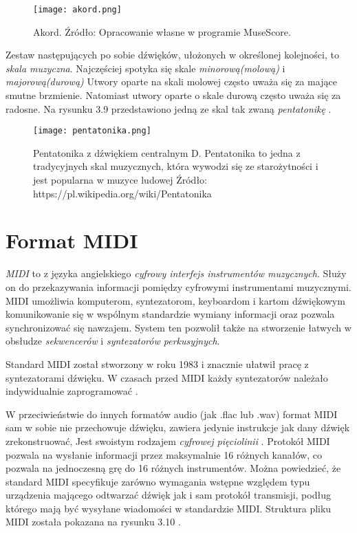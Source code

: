  \begin{figure}[H]
\texttt{[image: akord.png]}
\centering
\caption{Akord. Źródło: Opracowanie własne w programie MuseScore.}
\centering
\end{figure}

Zestaw następujących po sobie dźwięków, ułożonych w określonej kolejności, to \textit{skala muzyczna}. Najczęściej spotyka się skale \textit{minorową(molową)} i \textit{majorową(durową)} Utwory oparte na skali molowej często uważa się za mające smutne brzmienie. Natomiast utwory oparte o skale durową często uważa się za radosne. Na rysunku 3.9 przedstawiono jedną ze skal tak zwaną \textit{pentatonikę} \citep[s. 81 - 82]{Pilhofer2018}. 

 \begin{figure}[H]
\texttt{[image: pentatonika.png]}
\caption{Pentatonika z dźwiękiem centralnym D. Pentatonika to jedna z tradycyjnych skal muzycznych, która wywodzi się ze starożytności i jest popularna w muzyce ludowej  Źródło: https://pl.wikipedia.org/wiki/Pentatonika}
\centering
\end{figure}

\section{Format MIDI}
\textit{MIDI} to z języka angielskiego \textit{cyfrowy interfejs instrumentów muzycznych}. Służy on do przekazywania informacji pomiędzy cyfrowymi instrumentami muzycznymi. MIDI umożliwia komputerom, syntezatorom, keyboardom i kartom dźwiękowym komunikowanie się w wspólnym standardzie wymiany informacji oraz pozwala synchronizować się nawzajem. System ten pozwolił także na stworzenie łatwych w obsłudze \textit{sekwencerów} i \textit{syntezatorów perkusyjnych}.

Standard MIDI został stworzony w roku 1983 i znacznie ułatwił pracę z syntezatorami dźwięku. W czasach przed MIDI każdy syntezatorów należało indywidualnie zaprogramować \citep{MIDI}.

W przeciwieństwie do innych formatów audio (jak .flac lub .wav) format MIDI sam w sobie nie przechowuje dźwięku, zawiera jedynie instrukcje jak dany dźwięk zrekonstruować, Jest swoistym rodzajem \textit{cyfrowej pięciolinii} \citep[s. 1 - 2]{MIDI_Format}.
Protokół MIDI pozwala na wysłanie informacji przez maksymalnie 16 różnych kanałów, co pozwala na jednoczesną grę do 16 różnych instrumentów. Można powiedzieć, że standard MIDI specyfikuje zarówno wymagania wstępne względem typu urządzenia mającego odtwarzać dźwięk jak i sam protokół transmisji, podług którego mają być wysyłane wiadomości w standardzie MIDI. Struktura pliku MIDI została pokazana na rysunku 3.10 \citep[s. 1 - 2]{MIDI_Format}.

